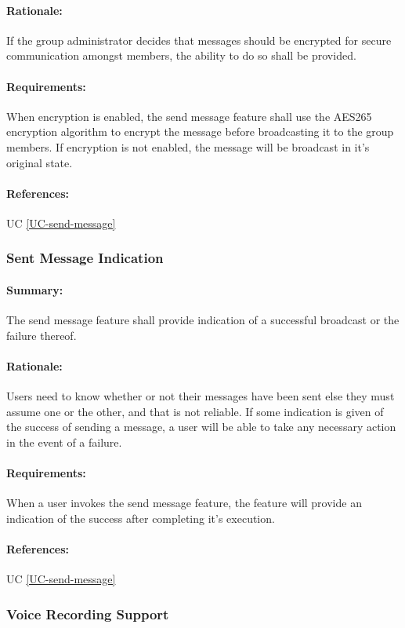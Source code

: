 \documentclass[11pt]{article}
\begin{document}
\paragraph{Rationale:} If the group administrator decides that messages should be encrypted for secure communication amongst members, the ability to do so shall be provided.
\paragraph{Requirements:} When encryption is enabled, the send message feature shall use the AES265 encryption algorithm to encrypt the message before broadcasting it to the group members. If encryption is not enabled, the message will be broadcast in it's original state.
\paragraph{References:} UC \ref{UC-send-message}

\subsubsection{Sent Message Indication} \label{FR-send-message-indicator}
\paragraph{Summary:} The send message feature shall provide indication of a successful broadcast or the failure thereof.
\paragraph{Rationale:} Users need to know whether or not their messages have been sent else they must assume one or the other, and that is not reliable. If some indication is given of the success of sending a message, a user will be able to take any necessary action in the event of a failure.
\paragraph{Requirements:} When a user invokes the send message feature, the feature will provide an indication of the success after completing it's execution.
\paragraph{References:} UC \ref{UC-send-message}

\subsubsection{Voice Recording Support} \label{FR-voice-record-support}
\end{document}
